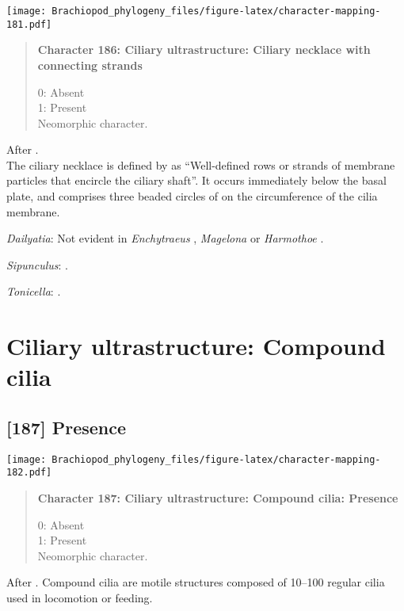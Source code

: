 \documentclass[openany]{book}
\theoremstyle{definition}
\theoremstyle{definition}
\theoremstyle{definition}
\theoremstyle{remark}
\begin{document}
\texttt{[image: Brachiopod\_phylogeny\_files/figure-latex/character-mapping-181.pdf]}

\begin{quote}
\textbf{Character 186: Ciliary ultrastructure: Ciliary necklace with
connecting strands}

0: Absent\\
1: Present\\
Neomorphic character.
\end{quote}

After \citet{Lundin2009}.\\
The ciliary necklace is defined by \citet{Gilula1972} as ``Well-defined
rows or strands of membrane particles that encircle the ciliary shaft''.
It occurs immediately below the basal plate, and comprises three beaded
circles of on the circumference of the cilia membrane.

\hypertarget{Dailyatia-coding-186}{}
\emph{Dailyatia}: Not evident in \emph{Enchytraeus} \citep{Reger1967},
\emph{Magelona} \citep{Bartolomaeus1995} or \emph{Harmothoe}
\citep{Holborow1969}.

\hypertarget{Sipunculus-coding-186}{}
\emph{Sipunculus}: \citet{Reed1982}.

\hypertarget{Tonicella-coding-186}{}
\emph{Tonicella}: \citep{Luter1995}.

\section{Ciliary ultrastructure: Compound
cilia}\label{ciliary-ultrastructure-compound-cilia}

\subsection*{{[}187{]} Presence}\label{presence-3}

\texttt{[image: Brachiopod\_phylogeny\_files/figure-latex/character-mapping-182.pdf]}

\begin{quote}
\textbf{Character 187: Ciliary ultrastructure: Compound cilia: Presence}

0: Absent\\
1: Present\\
Neomorphic character.
\end{quote}

After \citet{Lundin2009}. Compound cilia are motile structures composed
of 10--100 regular cilia used in locomotion or feeding.
\end{document}
